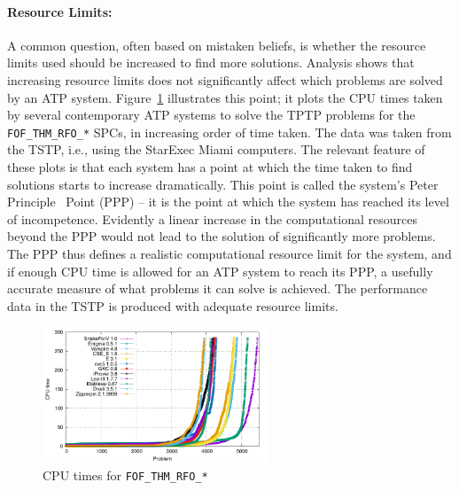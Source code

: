 \documentclass[runningheads]{llncs}
\begin{document}
\paragraph{Resource Limits:}
A common question, often based on mistaken beliefs, is whether the resource limits used should 
be increased to find more solutions.
Analysis shows that increasing resource limits does not significantly affect which problems 
are solved by an ATP system. 
Figure~\ref{PPPPlot} illustrates this point; it plots the CPU times taken by several contemporary 
ATP systems to solve the TPTP problems for the {\tt FOF\_THM\_RFO\_*} SPCs, in increasing order 
of time taken. 
The data was taken from the TSTP, i.e., using the StarExec Miami computers.
The relevant feature of these plots is that each system has a point at which the time taken to 
find solutions starts to increase dramatically. 
This point is called the system's Peter Principle~\cite{PH69} Point (PPP) -- it is the point at 
which the system has reached its level of incompetence. 
Evidently a linear increase in the computational resources beyond the PPP would not lead to the 
solution of significantly more problems. 
The PPP thus defines a realistic computational resource limit for the system, and if enough CPU 
time is allowed for an ATP system to reach its PPP, a usefully accurate measure of what problems 
it can solve is achieved.
The performance data in the TSTP is produced with adequate resource limits.

\begin{figure}[htb]
\centering
\includegraphics[width=0.6\textwidth]{FOF_THM_RFO_PPP.pdf}
\vspace*{-1em}
\caption{CPU times for {\tt FOF\_THM\_RFO\_*}}
\label{PPPPlot}
\end{figure}
\end{document}
